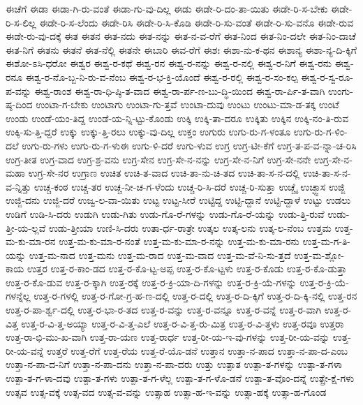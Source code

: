 {ಈಚೆಗೆ
ಈಡಾ
ಈಡಾ-ಗಿ-ರು-ವಂತೆ
ಈಡಾ-ಗು-ವು-ದಿಲ್ಲ
ಈಡು
ಈಡೇ-ರಿ-ದಂ-ತಾ-ಯಿತು
ಈಡೇ-ರಿ-ಸ-ಬೇಕು
ಈಡೇ-ರಿ-ಸ-ಲಿಲ್ಲ
ಈಡೇ-ರಿ-ಸ-ಲೆಂದು
ಈಡೇ-ರಿಸಿ
ಈಡೇ-ರಿ-ಸಿ-ಕೊಡಿ
ಈಡೇ-ರಿ-ಸು-ವಂತೆ
ಈಡೇ-ರಿ-ಸು-ವನೊ
ಈಡೇ-ರುವ
ಈಡೇ-ರು-ವು-ದಕ್ಕೆ
ಈತ
ಈತನ
ಈತ-ನದು
ಈತ-ನನ್ನು
ಈತ-ನ-ವ-ರೆಗೆ
ಈತ-ನಿಂದ
ಈತ-ನಿಂ-ದಲೇ
ಈತ-ನಿಂ-ದಾಚೆ
ಈತ-ನಿಗೆ
ಈತನು
ಈತನೆ
ಈತ-ನೆಲ್ಲಿ
ಈತನೇ
ಈಬಾರಿ
ಈವ-ರೆಗೆ
ಈಶಃ
ಈಶಾ-ನು-ಕ-ಥನ
ಈಶಾನ್ಯ
ಈಶಾ-ನ್ಯ-ದಿ-ಕ್ಕಿಗೆ
ಈಶೋ-ಽಸಿ-ಧರೋ
ಈಶ್ವರ
ಈಶ್ವ-ರ-ಕಥೆ
ಈಶ್ವ-ರನ
ಈಶ್ವ-ರ-ನನ್ನು
ಈಶ್ವ-ರ-ನಲ್ಲಿ
ಈಶ್ವ-ರ-ನಿಗೆ
ಈಶ್ವ-ರನು
ಈಶ್ವ-ರನೂ
ಈಶ್ವ-ರ-ನೊ-ಬ್ಬ-ನಿ-ರು-ವ-ನೆಂಬ
ಈಶ್ವ-ರ-ಭ-ಕ್ತಿ-ಯೊಂದೆ
ಈಶ್ವ-ರ-ರಲ್ಲಿ
ಈಶ್ವ-ರ-ಸಂ-ಕಲ್ಪ
ಈಶ್ವ-ರ-ಸ್ವ-ರೂ-ಪ-ವನ್ನು
ಈಶ್ವ-ರಾಂಶ
ಈಶ್ವ-ರಾ-ಧಿ-ಷ್ಠಿ-ತ-ವಾದ
ಈಶ್ವ-ರಾ-ರ್ಪ-ಣ-ಬು-ದ್ಧಿ-ಯಿಂದ
ಈಶ್ವ-ರಾ-ರ್ಪಿ-ತ-ವಾಗಿ
ಉಂಗು-ಷ್ಠ-ದಿಂದ
ಉಂಟಾ-ಗ-ಬೇಕು
ಉಂಟಾಗು
ಉಂಟಾ-ಗು-ತ್ತವೆ
ಉಂಟಾ-ದುವು
ಉಂಟು
ಉಂಟು-ಮಾ-ಡ-ತಕ್ಕ
ಉಂಟೆ
ಉಂಡು
ಉಂಡೆ-ಯಂ-ತಿದ್ದ
ಉಂಡೆ-ಯ-ನ್ನಿ-ಟ್ಟು-ಕೊಂಡು
ಉಕ್ಕಿ
ಉಕ್ಕಿ-ತಾ-ದರೂ
ಉಕ್ಕಿತು
ಉಕ್ಕಿನ
ಉಕ್ಕಿ-ನಂ-ತಿ-ರುವ
ಉಕ್ಕಿ-ಸು-ತ್ತಿ-ದ್ದರೆ
ಉಕ್ಕು
ಉಕ್ಕು-ತ್ತಿ-ರಲು
ಉಕ್ಕು-ವು-ದಿಲ್ಲ
ಉಕ್ತಂ
ಉಗುರು
ಉಗು-ರು-ಗ-ಳಂತೂ
ಉಗು-ರು-ಗ-ಳಿಂ-ದಲೆ
ಉಗು-ರು-ಗಳು
ಉಗು-ರು-ಗ-ಳುಈ
ಉಗು-ಳಿ-ದರೆ
ಉಗು-ಳುವ
ಉಗ್ರ
ಉಗ್ರ-ಟೀ-ಕೆಗೆ
ಉಗ್ರ-ತ-ಪ-ವ-ನ್ನಾ-ಚ-ರಿಸಿ
ಉಗ್ರ-ತೀತ
ಉಗ್ರ-ವಾದ
ಉಗ್ರ-ಶ್ರ-ವನು
ಉಗ್ರ-ಸೇನ
ಉಗ್ರ-ಸೇ-ನ-ನನ್ನು
ಉಗ್ರ-ಸೇ-ನ-ನಿಗೆ
ಉಗ್ರ-ಸೇ-ನನೇ
ಉಗ್ರ-ಸೇ-ನ-ಮಹಾ
ಉಗ್ರ-ಸೇ-ನರ
ಉಗ್ರಾಣ
ಉಚಿತ
ಉಚಿ-ತ-ವಾದ
ಉಚಿ-ತಾ-ನು-ಚಿ-ತದ
ಉಚಿ-ತಾ-ಸ-ನ-ದಲ್ಲಿ
ಉಚಿ-ತಾ-ಸ-ನ-ವ-ನ್ನಿತ್ತು
ಉಚ್ಚ-ಕಂಠ
ಉಚ್ಚ-ತರ
ಉಚ್ಚ-ನೀ-ಚ-ಗ-ಳೆಂದು
ಉಚ್ಚ-ರಿ-ಸಿ-ದರೆ
ಉಚ್ಚ-ರಿ-ಸುತ್ತಾ
ಉಚ್ಚೈ
ಉಚ್ಛ್ವಾಸ
ಉಜ್ಜಿ
ಉಜ್ಜಿ-ದನು
ಉಜ್ಜಿ-ದರೆ
ಉಜ್ವ-ಲ-ವಾ-ಯಿತು
ಉಟ್ಟ
ಉಟ್ಟ-ಸೀರೆ
ಉಟ್ಟಿದ್ದ
ಉಟ್ಟಿ-ದ್ದಾನೆ
ಉಟ್ಟಿ-ದ್ದಾಳೆ
ಉಟ್ಟು
ಉಡಲು
ಉಡಿಗೆ
ಉಡಿ-ಸಿ-ದರು
ಉಡುಗಿ
ಉಡು-ಗಿತು
ಉಡು-ಗೊ-ರೆ-ಗಳನ್ನು
ಉಡು-ಗೊ-ರೆ-ಯನ್ನು
ಉಡು-ತ್ತಿ-ರುವೆ
ಉಡು-ತ್ತೀ-ಯ-ಲ್ಲವೆ
ಉಡು-ತ್ತೀಯಾ
ಉಣಿ-ಸಿ-ದರು
ಉತಾ-ರ್ಧ-ರಾತ್ರೇ
ಉತ್ಕಲ
ಉತ್ಕ-ಲನು
ಉತ್ಕ-ಲ-ನೆಂಬ
ಉತ್ತಮ
ಉತ್ತ-ಮ-ಕು-ಮಾ-ರನ
ಉತ್ತ-ಮ-ಕು-ಮಾ-ರ-ನಂತೆ
ಉತ್ತ-ಮ-ಕು-ಮಾ-ರ-ನನ್ನು
ಉತ್ತ-ಮ-ಕು-ಮಾ-ರನು
ಉತ್ತ-ಮ-ಗ-ತಿ-ಯನ್ನು
ಉತ್ತ-ಮ-ನಾದ
ಉತ್ತ-ಮನು
ಉತ್ತ-ಮ-ರಾದ
ಉತ್ತ-ಮ-ವಾದ
ಉತ್ತ-ಮ-ವೆ-ನಿ-ಸು-ತ್ತದೆ
ಉತ್ತ-ಮ-ಶ್ಲೋ-ಕಾಯ
ಉತ್ತರ
ಉತ್ತ-ರ-ಕಾಂ-ಡದ
ಉತ್ತ-ರ-ಕೊ-ಟ್ಟ-ಅಪ್ಪ
ಉತ್ತ-ರ-ಕೊ-ಟ್ಟಳು
ಉತ್ತ-ರ-ಕೊಡು
ಉತ್ತ-ರ-ಕೊ-ಡುತ್ತಾ
ಉತ್ತ-ರ-ಕೊ-ಡುವ
ಉತ್ತ-ರ-ಕ್ಕಾಗಿ
ಉತ್ತ-ರಕ್ಕೆ
ಉತ್ತ-ರ-ಕ್ರಿ-ಯಾ-ದಿ-ಗಳನ್ನು
ಉತ್ತ-ರ-ಕ್ರಿ-ಯೆ-ಗಳನ್ನು
ಉತ್ತ-ರ-ಕ್ರಿ-ಯೆ-ಗಳನ್ನೆಲ್ಲ
ಉತ್ತ-ರ-ಗಳಲ್ಲಿ
ಉತ್ತ-ರ-ಗೋ-ಗ್ರ-ಹ-ಣ-ದಲ್ಲಿ
ಉತ್ತ-ರ-ದಲ್ಲಿ
ಉತ್ತ-ರ-ದಿ-ಕ್ಕಿಗೆ
ಉತ್ತ-ರ-ದಿ-ಕ್ಕಿ-ನಲ್ಲಿ
ಉತ್ತ-ರನ
ಉತ್ತ-ರ-ಪಾ-ರ್ಶ್ವ-ದಲ್ಲಿ
ಉತ್ತ-ರ-ಭಾ-ರ-ತದ
ಉತ್ತ-ರ-ವನ್ನು
ಉತ್ತ-ರ-ವನ್ನೂ
ಉತ್ತ-ರ-ವನ್ನೆ
ಉತ್ತ-ರ-ವಾಗಿ
ಉತ್ತ-ರ-ವಿತ್ತ
ಉತ್ತ-ರ-ವಿ-ತ್ತ-ಅಯ್ಯಾ
ಉತ್ತ-ರ-ವಿ-ತ್ತ-ಎಲೆ
ಉತ್ತ-ರ-ವಿ-ತ್ತ-ರು-ಮಿತ್ರ
ಉತ್ತ-ರ-ವಿ-ತ್ತಳು
ಉತ್ತ-ರವೂ
ಉತ್ತರಾ
ಉತ್ತ-ರಾ-ಭಿ-ಮು-ಖ-ವಾಗಿ
ಉತ್ತ-ರಾ-ಯಣ
ಉತ್ತ-ರಾರ್ಧ
ಉತ್ತ-ರೀ-ಯ-ಇ-ವು-ಗಳನ್ನು
ಉತ್ತ-ರೀ-ಯ-ವನ್ನು
ಉತ್ತ-ರೀ-ಯ-ವನ್ನೆ
ಉತ್ತರೆ
ಉತ್ತ-ರೆಗೆ
ಉತ್ತ-ರೆಯ
ಉತ್ತ-ರೆ-ಯೊ-ಡನೆ
ಉತ್ತಾನ
ಉತ್ತಾ-ನ-ಪಾದ
ಉತ್ತಾ-ನ-ಪಾ-ದ-ಎಂಬ
ಉತ್ತಾ-ನ-ಪಾ-ದ-ನಿಗೆ
ಉತ್ತಾ-ನ-ಪಾ-ದನು
ಉತ್ತಾ-ನ-ಪಾ-ದರು
ಉತ್ತು
ಉತ್ಪಾತ
ಉತ್ಪಾ-ತ-ಗಳನ್ನು
ಉತ್ಪಾ-ತ-ಗಳಾ
ಉತ್ಪಾ-ತ-ಗ-ಳಾ-ದವು
ಉತ್ಪಾ-ತ-ಗಳು
ಉತ್ಪಾ-ತ-ಗ-ಳೆಲ್ಲ
ಉತ್ಪಾ-ತ-ಗ-ಳೊ-ಡನೆ
ಉತ್ಪಾ-ತ-ವೊಂ-ದನ್ನೆ
ಉತ್ಪ್ರೇ-ಕ್ಷೆ-ಗಳು
ಉತ್ಸವ
ಉತ್ಸ-ವಕ್ಕೆ
ಉತ್ಸ-ವದ
ಉತ್ಸ-ವ-ವನ್ನು
ಉತ್ಸಾಹ
ಉತ್ಸಾ-ಹ-ಇ-ವನ್ನು
ಉತ್ಸಾ-ಹಕ್ಕೆ
ಉತ್ಸಾ-ಹ-ಗೊಂಡ
}
